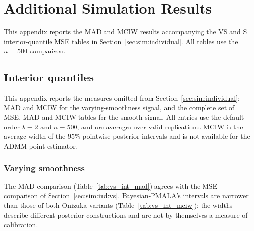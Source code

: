\section{Additional Simulation Results}
\label{app:simulation_results}

This appendix reports the MAD and MCIW results accompanying the VS and S interior-quantile MSE tables in Section~\ref{sec:sim:individual}. All tables use the $n=500$ comparison.

\subsection{Interior quantiles}
\label{app:sim:individual}

This appendix reports the measures omitted from Section~\ref{sec:sim:individual}: MAD and MCIW for the varying-smoothness signal, and the complete set of MSE, MAD and MCIW tables for the smooth signal. All entries use the default order $k=2$ and $n=500$, and are averages over valid replications. MCIW is the average width of the $95\%$ pointwise posterior intervals and is not available for the ADMM point estimator.

\subsubsection{Varying smoothness}
\label{app:sim:individual:vs}
The MAD comparison (Table~\ref{tab:vs_int_mad}) agrees with the MSE comparison of Section~\ref{sec:sim:ind:vs}. Bayesian-PMALA's intervals are narrower than those of both Onizuka variants (Table~\ref{tab:vs_int_mciw}); the widths describe different posterior constructions and are not by themselves a measure of calibration.

